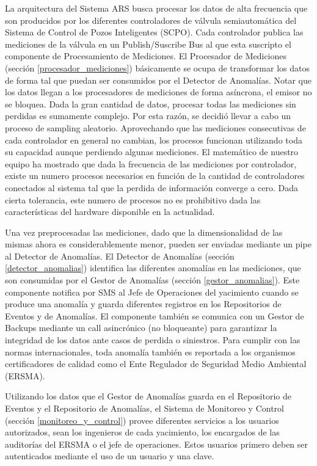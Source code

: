 \documentclass{article}
\theoremstyle{definition}
\theoremstyle{remark}
\begin{document}
La arquitectura del Sistema ARS busca procesar los datos de alta frecuencia que son producidos por los diferentes controladores de válvula semiautomática del Sistema de Control de Pozos Inteligentes (SCPO). Cada controlador publica las mediciones de la válvula en un Publish/Suscribe Bus al que esta suscripto el componente de Procesamiento de Mediciones. El Procesador de Mediciones (sección \ref{procesador_mediciones}) básicamente se ocupa de transformar los datos de forma tal que puedan ser consumidos por el Detector de Anomalías. Notar que los datos llegan a los procesadores de mediciones de forma asíncrona, el emisor no se bloquea. Dada la gran cantidad de datos, procesar todas las mediciones sin perdidas es sumamente complejo. Por esta razón, se decidió llevar a cabo un proceso de sampling aleatorio. Aprovechando que las mediciones consecutivas de cada controlador en general no cambian, los procesos funcionan utilizando toda su capacidad aunque perdiendo algunas mediciones. El matemático de nuestro equipo ha mostrado que dada la frecuencia de las mediciones por controlador, existe un numero procesos necesarios en función de la cantidad de controladores conectados al sistema tal que la perdida de información converge a cero. Dada cierta tolerancia, este numero de procesos no es prohibitivo dada las características del hardware disponible en la actualidad.

Una vez preprocesadas las mediciones, dado que la dimensionalidad de las mismas ahora es considerablemente menor, pueden ser enviadas mediante un pipe al Detector de Anomalías. El Detector de Anomalías (sección \ref{detector_anomalias}) identifica las diferentes anomalías en las mediciones, que son consumidas por el Gestor de Anomalías (sección \ref{gestor_anomalias}). Este componente notifica por SMS al Jefe de Operaciones del yacimiento cuando se produce una anomalía y guarda diferentes registros en los Repositorios de Eventos y de Anomalías. El componente también se comunica con un Gestor de Backups mediante un call asincrónico (no bloqueante) para garantizar la integridad de los datos ante casos de perdida o siniestros. Para cumplir con las normas internacionales, toda anomalía también es reportada a los organismos certificadores de calidad como el Ente Regulador de Seguridad Medio Ambiental (ERSMA).

Utilizando los datos que el Gestor de Anomalías guarda en el Repositorio de Eventos y el Repositorio de Anomalías, el Sistema de Monitoreo y Control (sección \ref{monitoreo_y_control}) provee diferentes servicios a los usuarios autorizados, sean los ingenieros de cada yacimiento, los encargados de las auditorías del ERSMA o el jefe de operaciones. Estos usuarios primero deben ser autenticados mediante el uso de un usuario y una clave.
\end{document}

